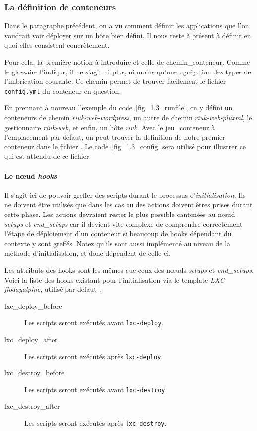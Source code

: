 \subsubsection{La définition de conteneurs}

Dans le paragraphe précédent, on a vu comment définir les \glspl{application} que l'on voudrait voir déployer sur un hôte bien défini.
Il nous reste à présent à définir en quoi elles consistent concrètement.

Pour cela, la première notion à introduire et celle de \gls{chemin_conteneur}.
Comme le glossaire l'indique, il ne s'agit ni plus, ni moins qu'une agrégation des types de l'\gls{imbrication} courante.
Ce chemin permet de trouver facilement le fichier {\tt config.yml} du conteneur en question.

En prennant à nouveau l'exemple du code~\ref{fig_1.3_runfile}, on y défini un conteneurs de chemin \emph{riuk-web-wordpress}, un autre de chemin \emph{riuk-web-pluxml}, le gestionnaire \emph{riuk-web}, et enfin, un hôte \emph{riuk}.
Avec le \gls{jeu_conteneur} à l'emplacement par défaut, on peut trouver la \gls{definition} de notre premier conteneur dans le fichier .
Le code~\ref{fig_1.3_config} sera utilisé pour illustrer ce qui est attendu de ce fichier.



\paragraph{Le nœud \emph{hooks}}
Il s'agit ici de pouvoir greffer des scripts durant le processus d'\emph{initialisation}.
Ils ne doivent être utilisés que dans les cas ou des actions doivent êtres prises durant cette phase.
Les actions devraient rester le plus possible cantonées au nœud \emph{setups} et \emph{end\_setups} car il devient vite complexe de comprendre correctement l'étape de déploiement d'un conteneur si beaucoup de hooks dépendant du contexte y sont greffés.
Notez qu'ils sont aussi implémenté au niveau de la méthode d'\gls{initialisation}, et donc dépendent de celle-ci.

Les attributs des hooks sont les mêmes que ceux des nœuds \emph{setups} et \emph{end\_setups}.
Voici la liste des hooks existant pour l'initialisation via le template \emph{LXC} \emph{flodayalpine}, utilisé par défaut~:

\begin{description}
	\item[lxc\_deploy\_before] Les scripts seront exécutés avant {\tt lxc-deploy}.
	\item[lxc\_deploy\_after] Les scripts seront exécutés après {\tt lxc-deploy}.
	\item[lxc\_destroy\_before] Les scripts seront exécutés avant {\tt lxc-destroy}.
	\item[lxc\_destroy\_after] Les scripts seront exécutés après {\tt lxc-destroy}.
\end{description}

